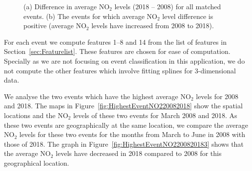 \documentclass[a4paper,11pt]{article}
\begin{document}
\begin{figure}[!htb]
  \centering
  \caption{(a) Difference in average $\text{NO}_2$ levels (2018 -- 2008) for all matched events. (b) The events for which average $\text{NO}_2$ level difference is positive (average $\text{NO}_2$ levels have increased from 2008 to 2018).}
  \label{fig:DifferenceInNO2Levels}
\end{figure}

For each event we compute features 1--8 and 14 from the list of features in Section~\ref{sec:Featurelist}. These features are chosen for ease of computation. Specially as we are not focusing on event classification in this application, we do not compute the other features which involve fitting splines for 3-dimensional data.  

We analyse the two events which have the highest average $\text{NO}_2$ levels for 2008 and 2018. The maps in Figure~\ref{fig:HighestEventNO220082018} show the spatial locations and the $\text{NO}_2$ levels of these two events for March 2008 and 2018. As these two events are geographically at the same location, we compare the average  $\text{NO}_2$ levels for these two events for the months from March to June in 2008 with those of 2018. The graph in Figure~\ref{fig:HighestEventNO2200820183} shows that the average $\text{NO}_2$ levels have decreased in 2018 compared to 2008 for this geographical location.  
\end{document}

